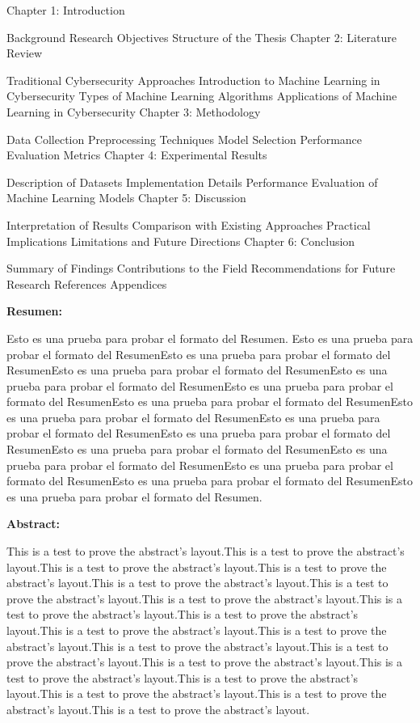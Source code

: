 \documentclass[11pt, a4paper]{article} %
\begin{document}
Chapter 1: Introduction

Background
Research Objectives
Structure of the Thesis
Chapter 2: Literature Review

Traditional Cybersecurity Approaches
Introduction to Machine Learning in Cybersecurity
Types of Machine Learning Algorithms
Applications of Machine Learning in Cybersecurity
Chapter 3: Methodology

Data Collection
Preprocessing Techniques
Model Selection
Performance Evaluation Metrics
Chapter 4: Experimental Results

Description of Datasets
Implementation Details
Performance Evaluation of Machine Learning Models
Chapter 5: Discussion

Interpretation of Results
Comparison with Existing Approaches
Practical Implications
Limitations and Future Directions
Chapter 6: Conclusion

Summary of Findings
Contributions to the Field
Recommendations for Future Research
References
Appendices

{\bfseries \large Resumen:} \vspace{5mm}

Esto es una prueba para probar el formato del Resumen. Esto es una prueba para probar el formato del ResumenEsto es una prueba para probar el formato del ResumenEsto es una prueba para probar el formato del ResumenEsto es una prueba para probar el formato del ResumenEsto es una prueba para probar el formato del ResumenEsto es una prueba para probar el formato del ResumenEsto es una prueba para probar el formato del ResumenEsto es una prueba para probar el formato del ResumenEsto es una prueba para probar el formato del ResumenEsto es una prueba para probar el formato del ResumenEsto es una prueba para probar el formato del ResumenEsto es una prueba para probar el formato del ResumenEsto es una prueba para probar el formato del ResumenEsto es una prueba para probar el formato del Resumen.
\vspace{1cm}

{\bfseries \large Abstract: }\vspace{5mm} 

This is a test to prove the abstract's layout.This is a test to prove the abstract's layout.This is a test to prove the abstract's layout.This is a test to prove the abstract's layout.This is a test to prove the abstract's layout.This is a test to prove the abstract's layout.This is a test to prove the abstract's layout.This is a test to prove the abstract's layout.This is a test to prove the abstract's layout.This is a test to prove the abstract's layout.This is a test to prove the abstract's layout.This is a test to prove the abstract's layout.This is a test to prove the abstract's layout.This is a test to prove the abstract's layout.This is a test to prove the abstract's layout.This is a test to prove the abstract's layout.This is a test to prove the abstract's layout.This is a test to prove the abstract's layout.This is a test to prove the abstract's layout.
\vspace{1cm}
\end{document}
